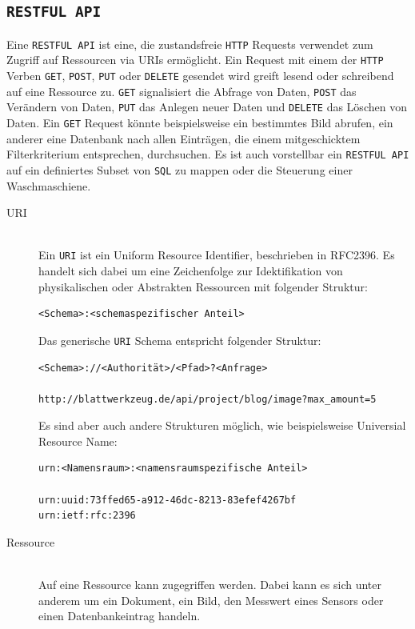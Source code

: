 \subsection{\texttt{RESTFUL API}}

Eine \texttt{RESTFUL API} ist eine, die zustandsfreie \texttt{HTTP} Requests
verwendet zum Zugriff auf Ressourcen via URIs ermöglicht. Ein Request mit
einem der \texttt{HTTP} Verben \texttt{GET}, \texttt{POST}, \texttt{PUT} oder
\texttt{DELETE} gesendet wird greift lesend oder schreibend auf eine Ressource
zu. \texttt{GET} signalisiert die Abfrage von Daten, \texttt{POST} das Verändern
von Daten, \texttt{PUT} das Anlegen neuer Daten und \texttt{DELETE} das Löschen
von Daten. Ein \texttt{GET} Request könnte beispielsweise ein bestimmtes Bild
abrufen, ein anderer eine Datenbank nach allen Einträgen, die einem
mitgeschicktem Filterkriterium entsprechen, durchsuchen. Es ist auch vorstellbar
ein \texttt{RESTFUL API} auf ein definiertes Subset von \texttt{SQL} zu mappen
oder die Steuerung einer Waschmaschiene.

\begin{description}
\item[URI] \mbox{}\\ Ein \texttt{URI} ist ein Uniform Resource Identifier,
  beschrieben in RFC2396\cite{rfc2396}. Es handelt sich dabei um eine Zeichenfolge zur
  Idektifikation von physikalischen oder Abstrakten Ressourcen mit folgender
  Struktur:
\begin{verbatim}
<Schema>:<schemaspezifischer Anteil>
\end{verbatim}
Das generische \texttt{URI} Schema entspricht folgender Struktur:
\begin{verbatim}
<Schema>://<Authorität>/<Pfad>?<Anfrage>

http://blattwerkzeug.de/api/project/blog/image?max_amount=5
\end{verbatim}
Es sind aber auch andere Strukturen möglich, wie beispielsweise Universial
Resource Name:
\begin{verbatim}
urn:<Namensraum>:<namensraumspezifische Anteil>

urn:uuid:73ffed65-a912-46dc-8213-83efef4267bf
urn:ietf:rfc:2396
\end{verbatim}
\item[Ressource] \mbox{}\\ Auf eine Ressource kann zugegriffen werden. Dabei
  kann es sich unter anderem um ein Dokument, ein Bild, den Messwert eines
  Sensors oder einen Datenbankeintrag handeln.
\end{description}

